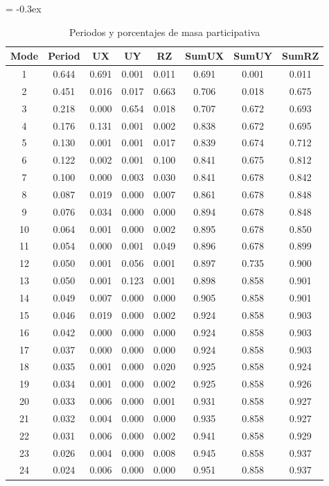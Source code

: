 \documentclass{article}%
\begin{document}
\begin{table}[H]%
\extrarowheight = -0.3ex%
\renewcommand{\arraystretch}{1.3}%
\centering%
\caption{Periodos y porcentajes de masa participativa}%
\begin{tabular}{cccccccc}
\toprule
Mode & Period & UX & UY & RZ & SumUX & SumUY & SumRZ \\
\midrule
1 & 0.644 & 0.691 & 0.001 & 0.011 & 0.691 & 0.001 & 0.011 \\
2 & 0.451 & 0.016 & 0.017 & 0.663 & 0.706 & 0.018 & 0.675 \\
3 & 0.218 & 0.000 & 0.654 & 0.018 & 0.707 & 0.672 & 0.693 \\
4 & 0.176 & 0.131 & 0.001 & 0.002 & 0.838 & 0.672 & 0.695 \\
5 & 0.130 & 0.001 & 0.001 & 0.017 & 0.839 & 0.674 & 0.712 \\
6 & 0.122 & 0.002 & 0.001 & 0.100 & 0.841 & 0.675 & 0.812 \\
7 & 0.100 & 0.000 & 0.003 & 0.030 & 0.841 & 0.678 & 0.842 \\
8 & 0.087 & 0.019 & 0.000 & 0.007 & 0.861 & 0.678 & 0.848 \\
9 & 0.076 & 0.034 & 0.000 & 0.000 & 0.894 & 0.678 & 0.848 \\
10 & 0.064 & 0.001 & 0.000 & 0.002 & 0.895 & 0.678 & 0.850 \\
11 & 0.054 & 0.000 & 0.001 & 0.049 & 0.896 & 0.678 & 0.899 \\
12 & 0.050 & 0.001 & 0.056 & 0.001 & 0.897 & 0.735 & 0.900 \\
13 & 0.050 & 0.001 & 0.123 & 0.001 & 0.898 & 0.858 & 0.901 \\
14 & 0.049 & 0.007 & 0.000 & 0.000 & 0.905 & 0.858 & 0.901 \\
15 & 0.046 & 0.019 & 0.000 & 0.002 & 0.924 & 0.858 & 0.903 \\
16 & 0.042 & 0.000 & 0.000 & 0.000 & 0.924 & 0.858 & 0.903 \\
17 & 0.037 & 0.000 & 0.000 & 0.000 & 0.924 & 0.858 & 0.903 \\
18 & 0.035 & 0.001 & 0.000 & 0.020 & 0.925 & 0.858 & 0.924 \\
19 & 0.034 & 0.001 & 0.000 & 0.002 & 0.925 & 0.858 & 0.926 \\
20 & 0.033 & 0.006 & 0.000 & 0.001 & 0.931 & 0.858 & 0.927 \\
21 & 0.032 & 0.004 & 0.000 & 0.000 & 0.935 & 0.858 & 0.927 \\
22 & 0.031 & 0.006 & 0.000 & 0.002 & 0.941 & 0.858 & 0.929 \\
23 & 0.026 & 0.004 & 0.000 & 0.008 & 0.945 & 0.858 & 0.937 \\
24 & 0.024 & 0.006 & 0.000 & 0.000 & 0.951 & 0.858 & 0.937 \\
\bottomrule
\end{tabular}
%
\end{table}
\end{document}
